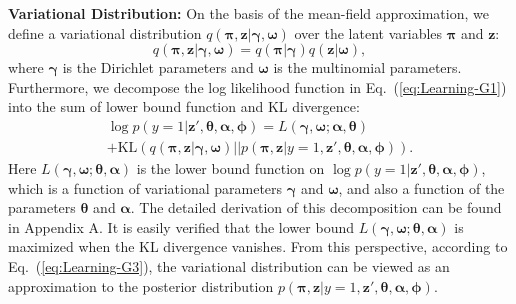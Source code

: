 \documentclass{article}
\begin{document}
\noindent\textbf{Variational Distribution:}
On the basis of the mean-field approximation, we define a variational distribution $q\left(\bm{\pi},\mathbf{z}|\bm{\gamma},\bm{\omega}\right)$ over the latent variables $\bm{\pi}$ and $\bm{z}$:
\begin{equation}
\label{eq:Learning-G2}
q\left(\bm{\pi}, \mathbf{z}|\bm{\gamma},\bm{\omega}\right)
= q\left(\bm{\pi}|\bm{\gamma}\right)
q\left(\mathbf{z}|\bm{\omega}\right),
\end{equation}
\noindent where $\bm{\gamma}$ is the Dirichlet parameters and $\bm{\omega}$ is the multinomial parameters.
Furthermore, we decompose the log likelihood function in Eq.~(\ref{eq:Learning-G1}) into the sum of lower bound function and KL divergence:
\begin{multline}
\log p\left(y=1|\mathbf{z}',\bm{\theta},\bm{\alpha}, \bm{\phi}\right)
=
L\left( \bm{\gamma},\bm{\omega};\bm{\alpha},\bm{\theta} \right) \\
+ \text{KL}\left( q\left( \bm{\pi},\mathbf{z} | \bm{\gamma},\bm{\omega} \right)
|| p\left( \bm{\pi}, \mathbf{z}|y=1, \mathbf{z}',\bm{\theta},\bm{\alpha},\bm{\phi} \right) \right).
\label{eq:Learning-G3}
\end{multline}
Here $L\left( \bm{\gamma},\bm{\omega};\bm{\theta},\bm{\alpha} \right)$ is the lower bound function on $\log p\left(y=1|\mathbf{z}',\bm{\theta},\bm{\alpha}, \bm{\phi}\right)$, which is a function of variational parameters $\bm{\gamma}$ and $\bm{\omega}$, and also a function of the parameters $\bm{\theta}$ and $\bm{\alpha}$.
The detailed derivation of this decomposition can be found in Appendix A.
It is easily verified that the lower bound $L\left( \bm{\gamma},\bm{\omega};\bm{\theta},\bm{\alpha} \right)$ is maximized when the KL divergence vanishes.
From this perspective, according to Eq.~(\ref{eq:Learning-G3}), the variational distribution can be viewed as an approximation to the posterior distribution $p\left( \bm{\pi}, \mathbf{z}|y=1, \mathbf{z}',\bm{\theta},\bm{\alpha},\bm{\phi} \right)$.
\end{document}
